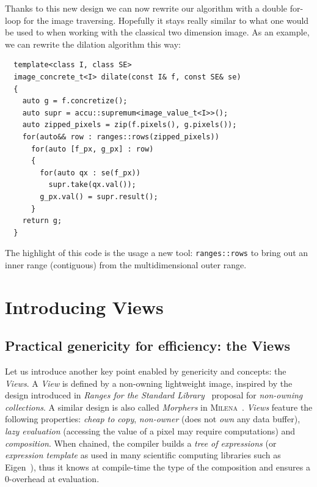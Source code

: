 Thanks to this new design we can now rewrite our algorithm with a double for-loop for the image traversing. Hopefully it
stays really similar to what one would be used to when working with the classical two dimension image. As an example, we
can rewrite the dilation algorithm this way:

\begin{verbatim}
  template<class I, class SE>
  image_concrete_t<I> dilate(const I& f, const SE& se)
  {
    auto g = f.concretize();
    auto supr = accu::supremum<image_value_t<I>>();
    auto zipped_pixels = zip(f.pixels(), g.pixels());
    for(auto&& row : ranges::rows(zipped_pixels))
      for(auto [f_px, g_px] : row)
      {
        for(auto qx : se(f_px))
          supr.take(qx.val());
        g_px.val() = supr.result();
      }
    return g;
  }
\end{verbatim}

The highlight of this code is the usage a new tool: \texttt{ranges::rows} to bring out an inner range (contiguous) from
the multidimensional outer range.


\section{Introducing Views}
\label{sec.views}

\subsection{Practical genericity for efficiency: the Views}
\label{subsec.views}

Let us introduce another key point enabled by genericity and concepts: the \emph{Views}. A \emph{View} is defined by a
non-owning lightweight image, inspired by the design introduced in \emph{Ranges for the Standard
  Library}~\citep{niebler.2014.ranges} proposal for \emph{non-owning collections}. A similar design is also called
\emph{Morphers} in \textsc{Milena}~\citep{levillain.2009.ismm, geraud.2012.hdr}. \emph{Views} feature the following
properties: \emph{cheap to copy}, \emph{non-owner} (does not \emph{own} any data buffer), \emph{lazy evaluation}
(accessing the value of a pixel may require computations) and \emph{composition}. When chained, the compiler builds a
\emph{tree of expressions} (or \emph{expression template} as used in many scientific computing libraries such as
Eigen~\cite{guennebaud.2010.eigen}), thus it knows at compile-time the type of the composition and ensures a 0-overhead
at evaluation.

